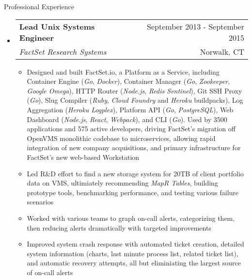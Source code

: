 \documentclass[letterpaper,10pt]{article}
\makeatletter
\newenvironment{ressection}[1]{
	\vspace{4pt}
	{\fontfamily{phv}\selectfont\Large#1}
	\begin{itemize}
	\vspace{3pt}
}{
	\end{itemize}
}
\newcommand{\ressubitem}[1]{
	\vspace{-1pt}
	\item \begin{flushleft} #1 \end{flushleft}
}
\newcommand{\resbigitem}[4]{
	\vspace{-5pt}
	\item
	\begin{tabular*}{6in}{l@{\extracolsep{\fill}}r}
		\textbf{#1} & #2 \\
		\textit{#3} & #4\\
	\end{tabular*}
}
\newenvironment{ressubsec}[4]{
	\resbigitem{#1}{#2}{#3}{#4}
	\vspace{-2pt}
	\begin{itemize}
}{
	\end{itemize}
}
\makeatother
\begin{document}
\begin{ressection}{Professional Experience}
	\begin{ressubsec}{Lead Unix Systems Engineer}{September 2013 - September 2015}{FactSet Research Systems}{Norwalk, CT}
		\ressubitem{Designed and built FactSet.io, a Platform as a Service, including Container Engine (\textit{Go}, \textit{Docker}), Container Manager (\textit{Go}, \textit{Zookeeper}, \textit{Google Omega}), HTTP Router (\textit{Node.js}, \textit{Redis Sentinel}), Git SSH Proxy (\textit{Go}), Slug Compiler (\textit{Ruby}, \textit{Cloud Foundry} and \textit{Heroku} buildpacks), Log Aggregation (\textit{Heroku Logplex}), Platform API (\textit{Go}, \textit{PostgreSQL}), Web Dashboard (\textit{Node.js}, \textit{React}, \textit{Webpack}), and CLI (\textit{Go}).  Used by 3500 applications and 575 active developers, driving FactSet's migration off OpenVMS monolithic codebase to microservices, allowing rapid integration of new company acquisitions, and primary infrastructure for FactSet's new web-based Workstation}
		\ressubitem{Led R\&D effort to find a new storage system for 20TB of client portfolio data on VMS, ultimiately recommending \textit{MapR Tables}, building prototype tools, benchmarking performance, and testing various failure scenarios}
		\ressubitem{Worked with various teams to graph on-call alerts, categorizing them, then reducing alerts dramatically with targeted improvements}
		\ressubitem{Improved system crash response with automated ticket creation, detailed system information (charts, last minute process list, related ticket list), and automatic recovery attempts, all but eliminiating the largest source of on-call alerts}
	\end{ressubsec}



\end{ressection}
\end{document}

